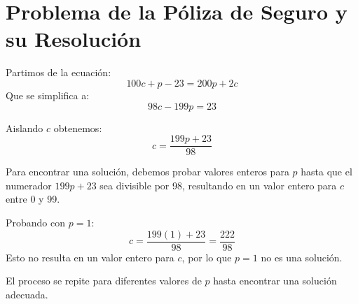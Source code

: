 \documentclass{article}
\begin{document}
\section*{Problema de la Póliza de Seguro y su Resolución}

Partimos de la ecuación:
\[ 100c + p - 23 = 200p + 2c \]
Que se simplifica a:
\[ 98c - 199p = 23 \]

Aislando \( c \) obtenemos:
\[ c = \frac{199p + 23}{98} \]

Para encontrar una solución, debemos probar valores enteros para \( p \) hasta que el numerador \( 199p + 23 \) sea divisible por 98, resultando en un valor entero para \( c \) entre 0 y 99.

Probando con \( p = 1 \):
\[ c = \frac{199(1) + 23}{98} = \frac{222}{98} \]
Esto no resulta en un valor entero para \( c \), por lo que \( p = 1 \) no es una solución.

El proceso se repite para diferentes valores de \( p \) hasta encontrar una solución adecuada.
\end{document}
